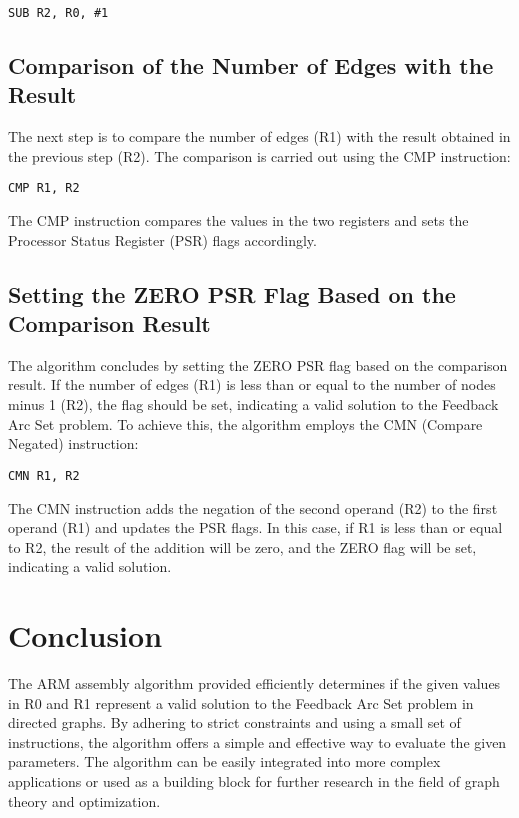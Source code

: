 \begin{verbatim}
SUB R2, R0, #1
\end{verbatim}

\subsection{Comparison of the Number of Edges with the Result}

The next step is to compare the number of edges (R1) with the result obtained in the previous step (R2). The comparison is carried out using the CMP instruction:

\begin{verbatim}
CMP R1, R2
\end{verbatim}

The CMP instruction compares the values in the two registers and sets the Processor Status Register (PSR) flags accordingly.

\subsection{Setting the ZERO PSR Flag Based on the Comparison Result}

The algorithm concludes by setting the ZERO PSR flag based on the comparison result. If the number of edges (R1) is less than or equal to the number of nodes minus 1 (R2), the flag should be set, indicating a valid solution to the Feedback Arc Set problem. To achieve this, the algorithm employs the CMN (Compare Negated) instruction:

\begin{verbatim}
CMN R1, R2
\end{verbatim}

The CMN instruction adds the negation of the second operand (R2) to the first operand (R1) and updates the PSR flags. In this case, if R1 is less than or equal to R2, the result of the addition will be zero, and the ZERO flag will be set, indicating a valid solution.

\section{Conclusion}

The ARM assembly algorithm provided efficiently determines if the given values in R0 and R1 represent a valid solution to the Feedback Arc Set problem in directed graphs. By adhering to strict constraints and using a small set of instructions, the algorithm offers a simple and effective way to evaluate the given parameters. The algorithm can be easily integrated into more complex applications or used as a building block for further research in the field of graph theory and optimization.

